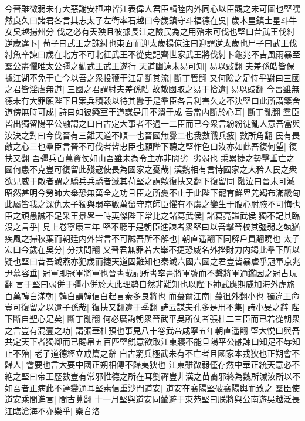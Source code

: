 今晉雖微弱未有大惡謝安桓冲皆江表偉人君臣輯睦内外同心以臣觀之未可圖也堅嘿然良久曰諸君各言其志太子左衛率石越曰今歲鎮守斗福德在吳|{
	歲木星鎮土星斗牛女吳越揚州分}
伐之必有夭殃且彼據長江之險民為之用殆未可伐也堅曰昔武王伐紂逆歲違卜|{
	荀子曰武王之誅紂也東面而迎太歲揚倞注曰迎謂逆太歲也尸子曰武王伐紂魚辛諫曰歲在北方不可北征武王不從史記齊世家武王將伐紂卜龜兆不吉風雨暴至羣公盡懼唯太公彊之勸武王武王遂行}
天道幽遠未易可知|{
	易以䜴翻}
夫差孫皓皆保據江湖不免于亡今以吾之衆投鞭于江足斷其流|{
	斷丁管翻}
又何險之足恃乎對曰三國之君皆淫虐無道|{
	三國之君謂紂夫差孫皓}
故敵國取之易于拾遺|{
	易以豉翻}
今晉雖無德未有大罪願陛下且案兵積穀以待其釁于是羣臣各言利害久之不決堅曰此所謂築舍道傍無時可成|{
	詩曰如彼築室于道謀是用不潰于成}
吾當内斷於心耳|{
	斷丁亂翻}
羣臣皆出獨留陽平公融謂之曰自古定大事者不過一二臣而已今衆言紛紛徒亂人意吾當與汝決之對曰今伐晉有三難天道不順一也晉國無釁二也我數戰兵疲|{
	數所角翻}
民有畏敵之心三也羣臣言晉不可伐者皆忠臣也願陛下聽之堅作色曰汝亦如此吾復何望|{
	復扶又翻}
吾彊兵百萬資仗如山吾雖未為令主亦非闇劣|{
	劣弱也}
乘累捷之勢擊垂亡之國何患不克豈可復留此殘寇使長為國家之憂哉|{
	漢魏相有言恃國家之大矜人民之衆欲見威于敵者謂之驕兵兵驕者滅其苻堅之謂歟復扶又翻下復留同}
融泣曰晉未可滅昭然甚明今勞師大舉恐無萬全之功且臣之所憂不止于此陛下寵育鮮卑羌羯布滿畿甸此屬皆我之深仇太子獨與弱卒數萬留守京師臣懼有不虞之變生于腹心肘腋不可悔也臣之頑愚誠不足采王景畧一時英傑陛下常比之諸葛武侯|{
	諸葛亮諡武侯}
獨不記其臨沒之言乎|{
	見上卷寧康三年}
堅不聽于是朝臣進諫者衆堅曰以吾擊晉校其彊弱之埶猶疾風之掃秋葉而朝廷内外皆言不可誠吾所不解也|{
	朝直遥翻下同解戶買翻曉也}
太子宏曰今歲在吳分|{
	分扶問翻}
又晉君無罪若大舉不捷恐威名外挫財力内竭此羣下所以疑也堅曰昔吾滅燕亦犯歲而捷天道固難知也秦滅六國六國之君豈皆暴虐乎冠軍京兆尹慕容垂|{
	冠軍即冠軍將軍也晉書載記所書率書將軍號而不繫將軍通鑑因之冠古玩翻}
言于堅曰弱併于彊小併於大此理勢自然非難知也以陛下神武應期威加海外虎旅百萬韓白滿朝|{
	韓白謂韓信白起言秦多良將也}
而蕞爾江南|{
	蕞徂外翻小也}
獨違王命豈可復留之以遺子孫哉|{
	復扶又翻遺于季翻}
詩云謀夫孔多是用不集|{
	詩小旻之辭}
陛下斷自聖心足矣|{
	斷丁亂翻}
何必廣詢朝衆晉武平吳所仗者張杜二三臣而已若從朝衆之言豈有混壹之功|{
	謂張華杜預也事見八十卷武帝咸寧五年朝直遥翻}
堅大悦曰與吾共定天下者獨卿而已賜帛五百匹堅鋭意欲取江東寢不能旦陽平公融諫曰知足不辱知止不殆|{
	老子道德經立戒篇之辭}
自古窮兵極武未有不亡者且國家本戎狄也正朔會不歸人|{
	會要也言大要中國正朔相傳不歸夷狄也}
江東雖微弱僅存然中華正統天意必不絶之堅曰帝王歷數豈有常邪惟德之所在耳劉禪豈非漢之苗裔邪終為魏所滅汝所以不如吾者正病此不達變通耳堅素信重沙門道安|{
	道安在襄陽堅破襄陽輿而致之}
羣臣使道安乘間進言|{
	間古莧翻}
十一月堅與道安同輦遊于東苑堅曰朕將與公南遊吳越泛長江臨滄海不亦樂乎|{
	樂音洛}
